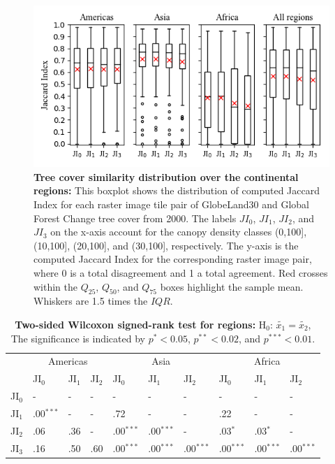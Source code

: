 			\begin{figure}[ht]
				\centering
				\includegraphics[scale=.91]{img/jaccard}
				\caption[Tree cover similarity distribution of the continental regions]{\textbf{Tree cover similarity distribution over the continental regions:} This boxplot shows the distribution of computed Jaccard Index for each raster image tile pair of GlobeLand30 and Global Forest Change tree cover from 2000. The labels $JI_0$, $JI_1$, $JI_2$, and $JI_3$ on the x-axis account for the canopy density classes (0,100], (10,100], (20,100], and (30,100], respectively. The y-axis is the computed Jaccard Index for the corresponding raster image pair, where 0 is a total disagreement and 1 a total agreement. Red crosses within the $Q_{25}$, $Q_{50}$, and $Q_{75}$ boxes highlight the sample mean. Whiskers are 1.5 times the $IQR$.}
				\label{fig:jaccard}
			\end{figure}
			\begin{table}[ht]
				\centering
				\caption[Two-sided Wilcoxon signed-rank test for regions]{\textbf{Two-sided Wilcoxon signed-rank test for regions:} H$_0$: $\tilde{x_1}=\tilde{x_2}$, The significance is indicated by $p^{*}<0.05$, $p^{**}<0.02$, and $p^{***}<0.01$.}
				\label{tab:wilcoxontwosided_regions}
				\begin{tabular}{llllllllll}
					\hline
					& \multicolumn{3}{c}{Americas} & \multicolumn{3}{c}{Asia} & \multicolumn{3}{c}{Africa} \\
					 & JI$_0$ & JI$_1$ & JI$_2$ & JI$_0$ & JI$_1$ & JI$_2$ & JI$_0$ & JI$_1$ & JI$_2$ \\\hline
					JI$_0$ & - & - & - & - & - & - & - & - & - \\
					JI$_1$ & .00$^{***}$ & - & - & .72 & - & - & .22 & - & - \\
					JI$_2$ & .06 & .36 & - & .00$^{***}$ & .00$^{***}$ & - & .03$^{*}$ & .03$^{*}$  & - \\
					JI$_3$ & .16 & .50 & .60 & .00$^{***}$ & .00$^{***}$ & .00$^{***}$ & .00$^{***}$ & .00$^{***}$ & .00$^{***}$ \\\hline
				\end{tabular}
			\end{table}
